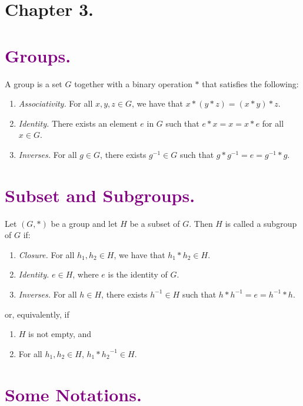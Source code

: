 \documentclass{article}
\begin{document}
   \section*{Chapter 3.}

   \section*{\textcolor{purple}{Groups.}} A group is a set $G$ together with a
   binary operation $*$ that satisfies the following:
   \begin{enumerate}
      \item \textit{Associativity.} For all $x, y, z \in G$, we have that
            $x * (y * z) = (x * y) * z$.
      \item \textit{Identity.} There exists an element $e$ in $G$ such that
            $e * x = x = x * e$ for all $x \in G$.
      \item \textit{Inverses.} For all $g \in G$, there exists $g^{-1} \in G$
            such that $g * g^{-1} = e = g^{-1} * g$.
   \end{enumerate}

   \section*{\textcolor{purple}{Subset and Subgroups.}} Let $(G, *)$ be a
   group and let $H$ be a subset of $G$. Then $H$ is called a subgroup of $G$
   if:
   \begin{enumerate}
      \item \textit{Closure.} For all $h_1, h_2 \in H$, we have that
            $h_1 * h_2 \in H$.
      \item \textit{Identity.} $e \in H$, where $e$ is the identity of $G$.
      \item \textit{Inverses.} For all $h \in H$, there exists $h^{-1} \in H$
            such that $h * h^{-1} = e = h^{-1} * h$.
   \end{enumerate}

   or, equivalently, if
   \begin{enumerate}
      \item $H$ is not empty, and
      \item For all $h_1, h_2 \in H$, $h_1 * {h_2}^{-1} \in H$.
   \end{enumerate}

   \section*{\textcolor{purple}{Some Notations.}}
\end{document}
